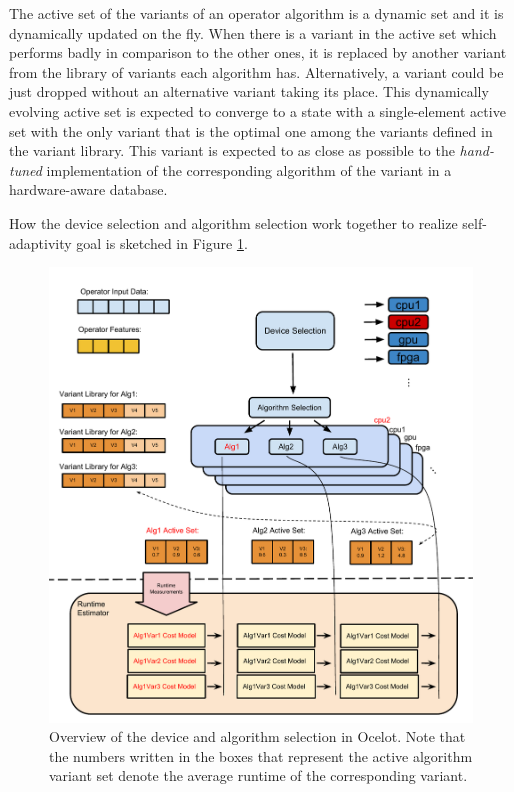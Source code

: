 The active set of the variants of an operator algorithm is a dynamic set and it is dynamically updated on the fly. When there is a variant in the active set which performs badly in comparison to the other ones, it is replaced by another variant from the library of variants each algorithm has. Alternatively, a variant could be just dropped without an alternative variant taking its place. This dynamically evolving active set is expected to converge to a state with a single-element active set with the only variant that is the optimal one among the variants defined in the variant library. This variant is expected to as close as possible to the \textit{hand-tuned} implementation of the corresponding algorithm of the variant in a hardware-aware database.

How the device selection and algorithm selection work together to realize self-adaptivity goal is sketched in Figure \ref{fig:Ocelot}.

\begin{figure}[htbp]
  \centering
    \includegraphics[width=\linewidth]{./Figures/Ocelot.pdf}
  \caption{Overview of the device and algorithm selection in Ocelot. Note that the numbers written in the boxes that represent the active algorithm variant set denote the average runtime of the corresponding variant.}
  \label{fig:Ocelot}
\end{figure}

